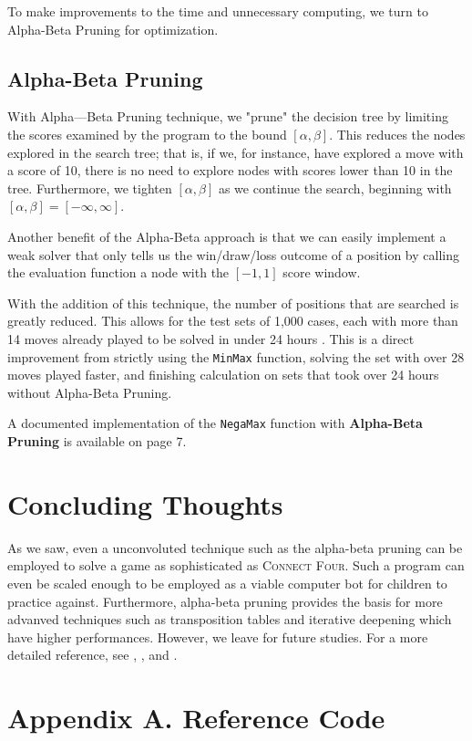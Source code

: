 \documentclass[12pt]{article}
\newcommand{\name}{\textsc{Connect Four}}
\begin{document}
To make improvements to the time and unnecessary computing, we turn to Alpha-Beta Pruning for optimization.

\subsection{Alpha-Beta Pruning}
With Alpha—Beta Pruning technique, we "prune" the decision tree by limiting the scores examined by the program to the bound $[\alpha, \beta]$. This reduces the nodes explored in the search tree; that is, if we, for instance, have explored a move with a score of 10, there is no need to explore nodes with scores lower than 10 in the tree. Furthermore, we tighten $[\alpha, \beta]$ as we continue the search, beginning with $[\alpha, \beta] = [-\infty, \infty]$.

Another benefit of the Alpha-Beta approach is that we can easily implement a weak solver that only tells us the win/draw/loss outcome of a position by calling the evaluation function a node with the $[-1,1]$ score window.

With the addition of this technique, the number of positions that are searched is greatly reduced.  This allows for the test sets of 1,000 cases, each with more than 14 moves already played to be solved in under 24 hours \cite{solvingconnect}.  This is a direct improvement from strictly using the \texttt{MinMax} function, solving the set with over 28 moves played faster, and finishing calculation on sets that took over 24 hours without Alpha-Beta Pruning.

A documented implementation of the \texttt{NegaMax} function with \textbf{Alpha-Beta Pruning} is available on page 7.

\section{Concluding Thoughts}
As we saw, even a unconvoluted technique such as the alpha-beta pruning can be employed to solve a game as sophisticated as \name. Such a program can even be scaled enough to be employed as a viable computer bot for children to practice against. Furthermore, alpha-beta pruning provides the basis for more advanved techniques such as transposition tables and iterative deepening which have higher performances. However, we leave for future studies. For a more detailed reference, see \cite{allis1988knowledge}, \cite{solvingconnect}, and \cite{trompplayground}.

\newpage
\section*{Appendix A. Reference Code}


\newpage


\end{document}
